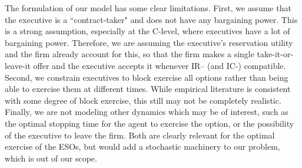 The formulation of our model has some clear limitations. First, we assume that the executive is a ``contract-taker" and does not have any bargaining power. This is a strong assumption, especially at the C-level, where executives have a lot of bargaining power. Therefore, we are assuming the executive's reservation utility and the firm already account for this, so that the firm makes a single take-it-or-leave-it offer and the executive accepts it whenever IR– (and IC-) compatible. Second, we constrain executives to block exercise all options rather than being able to exercise them at different times. While empirical literature is consistent with some degree of block exercise, %
this still may not be completely realistic. Finally, we are not modeling other dynamics which may be of interest, such as the optimal stopping time for the agent to exercise the option, or the possibility of the executive to leave the firm. Both are clearly relevant for the optimal exercise of the ESOs, but would add a stochastic machinery to our problem, which is out of our scope. 



